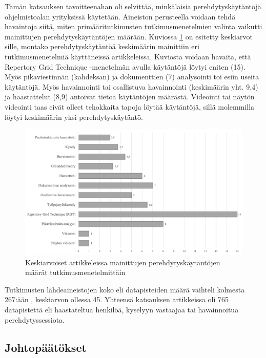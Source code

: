 \documentclass[utf8]{gradu3}
\begin{document}
Tämän katsauksen tavoitteenahan oli selvittää, minkälaisia perehdytyskäytäntöjä ohjelmistoalan yrityksissä käytetään. Aineiston perusteella voidaan tehdä havaintoja siitä, miten primääritutkimusten tutkimusmenetelmien valinta vaikutti mainittujen perehdytyskäytäntöjen määrään. Kuviossa \ref{kuvio:menetelmilla-havaitut-kaytannot} on esitetty keskiarvot sille, montako perehdytyskäytäntöä keskimäärin mainittiin eri tutkimusmenetelmiä käyttäneissä artikkeleissa. Kuviosta voidaan havaita, että Repertory Grid Technique -menetelmän avulla käytäntöjä löytyi eniten (15). Myös pikaviestinnän (kahdeksan) ja dokumenttien (7) analysointi toi esiin useita käytäntöjä. Myös havainnointi tai osallistuva havainnointi (keskimäärin yht. 9,4) ja haastattelut (8,9) antoivat tietoa käytäntöjen määrästä. Videointi tai näytön videointi taas eivät olleet tehokkaita tapoja löytää käytäntöjä, sillä molemmilla löytyi keskimäärin yksi perehdytyskäytäntö.

\begin{figure}[h]
    \centering
    \includegraphics[width=\textwidth]{media/menetelmilla-havaitut-kaytannot.png}
    \caption{Keskiarvoiset artikkeleissa mainittujen perehdytyskäytäntöjen määrät tutkimusmenetelmittäin}
    \label{kuvio:menetelmilla-havaitut-kaytannot}
\end{figure}

Tutkimusten lähdeaineistojen koko eli datapisteiden määrä vaihteli kolmesta \textcite{kulkarni-ym-2010} 267:ään \textcite{rodeghero-ym-2021}, keskiarvon ollessa 45. Yhteensä katsauksen artikkeissa oli 765 datapistettä eli haastateltua henkilöä, kyselyyn vastaajaa tai havainnoitua perehdytyssessiota.

\subsection{Johtopäätökset}
\end{document}
